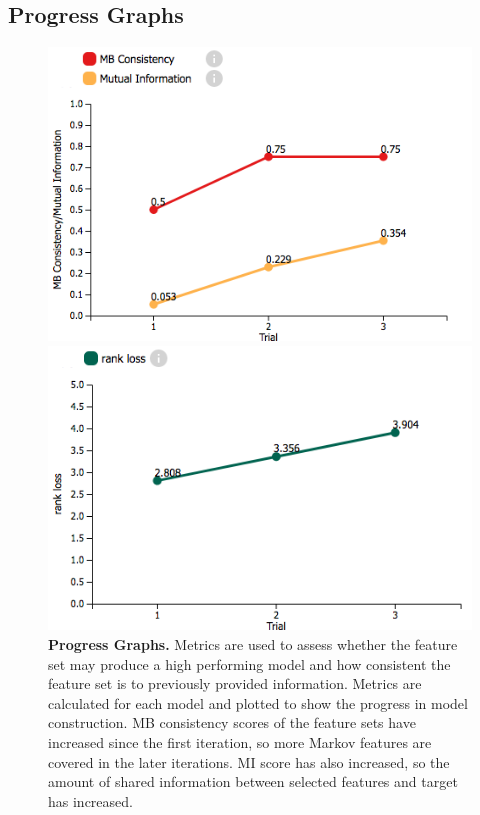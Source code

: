 \subsection{Progress Graphs}
\begin{figure}[!htbp]
    \centering
    \begin{minipage}{0.5\textwidth}
        \centering
        \includegraphics[width=1\textwidth]{MIGraph}
    \end{minipage}\hfill
    \begin{minipage}{0.5\textwidth}
        \centering
        \includegraphics[width=1\textwidth]{RankLossGraph}
    \end{minipage}
    \caption{\textbf{Progress Graphs.} Metrics are used to assess whether the feature set may produce a high performing model and how consistent the feature set is to previously provided information. Metrics are calculated for each model and plotted to show the progress in model construction. MB consistency scores of the feature sets have increased since the first iteration, so more Markov features are covered in the later iterations. MI score has also increased, so the amount of shared information between selected features and target has increased. } \label{fig:ProgressGraph}
\end{figure}

